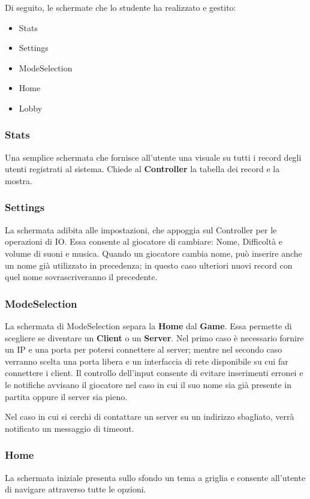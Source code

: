     Di seguito, le schermate che lo studente ha realizzato e gestito:
        \begin{itemize}
	        \item Stats
	        \item Settings
	        \item ModeSelection
            \item Home
            \item Lobby
        \end{itemize}

    \subsubsection{Stats}
        Una semplice schermata che fornisce all'utente una visuale su tutti i record degli utenti registrati al sistema.
        Chiede al \textbf{Controller} la tabella dei record e la mostra.


    \subsubsection{Settings}
        La schermata adibita alle impostazioni, che appoggia sul Controller per le operazioni di IO. Essa consente al giocatore di cambiare: Nome, Difficoltà e volume di suoni e musica.
        Quando un giocatore cambia nome, può inserire anche un nome già utilizzato in precedenza; in questo caso ulteriori nuovi 
        record con quel nome sovrascriveranno il precedente.

  \subsubsection{ModeSelection}
        La schermata di ModeSelection separa la \textbf{Home} dal \textbf{Game}.
        Essa permette di scegliere se diventare un \textbf{Client} o un \textbf{Server}. Nel primo caso è necessario fornire un IP e una porta per potersi connettere al server; mentre nel secondo caso verranno scelta una porta libera e un interfaccia di rete disponibile su cui far connettere i client.
        Il controllo dell'input consente di evitare inserimenti erronei e le notifiche avvisano il giocatore nel caso in cui il suo nome sia già presente in partita oppure il server sia pieno.
        
        Nel caso in cui si cerchi di contattare un server su un indirizzo sbagliato, verrà notificato un messaggio di timeout.
        
    \subsubsection{Home}
        La schermata iniziale presenta sullo sfondo un tema a griglia e consente all'utente di navigare attraverso tutte le opzioni.
    
